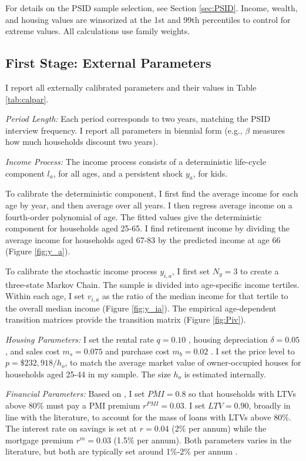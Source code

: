 \documentclass[12pt]{article}
\begin{document}
For details on the PSID sample selection, see Section \ref{sec:PSID}. Income, wealth, and housing values are winsorized at the 1st and 99th percentiles to control for extreme values. All calculations use family weights. 

\subsection{First Stage: External Parameters}
I report all externally calibrated parameters and their values in Table \ref{tab:calpar}.

\textit{Period Length:} Each period corresponds to two years, matching the PSID interview frequency. I report all parameters in biennial form (e.g., $\beta$ measures how much households discount two years).

\textit{Income Process:} The income process consists of a deterministic life-cycle component $l_a$, for all ages, and a persistent shock $y_a$, for kids. 

To calibrate the deterministic component, I first find the average income for each age by year, and then average over all years. I then regress average income on a fourth-order polynomial of age. The fitted values give the deterministic component for households aged 25-65. I find retirement income by dividing the average income for households aged 67-83 by the predicted income at age 66 (Figure \ref{fig:y_a}). 

To calibrate the stochastic income process $y_{i,a}$, I first set $N_y=3$ to create a three-state Markov Chain. The sample is divided into age-specific income tertiles. Within each age, I set  $v_{i,a}$ as the ratio of the median income for that tertile to the overall median income (Figure \ref{fig:y_ia}). The empirical age-dependent transition matrices provide the transition matrix (Figure \ref{fig:Piv}).

\textit{Housing Parameters:} I set the rental rate $q=0.10$ \citep{Davis2008}, housing depreciation $\delta=0.05$ \citep{Harding2007}, and sales cost $m_s=0.075$ and purchase cost $m_b=0.02$ \citep{Yang2009}. I set the price level to $p=\$232,918/h_o$, to match the average market value of owner-occupied houses for households aged 25-44 in my sample. The size $h_o$ is estimated internally.

\textit{Financial Parameters:} Based on \cite{goodman2017sixty}, I set $\overline{PMI}=0.8$ so that households with LTVs above 80\% must pay a PMI premium $r^{PMI}=0.03$. I set $LTV=0.90$, broadly in line with the literature, to account for the mass of loans with LTVs above 80\%. The interest rate on savings is set at $r = 0.04$ (2\% per annum) while the mortgage premium $r^m=0.03$ (1.5\% per annum). Both parameters varies in the literature, but both are typically set around 1\%-2\% per annum \citep[see e.g.,][]{Cocco2005b,Kaplan2020,Paz-Pardo2019}.
\end{document}
